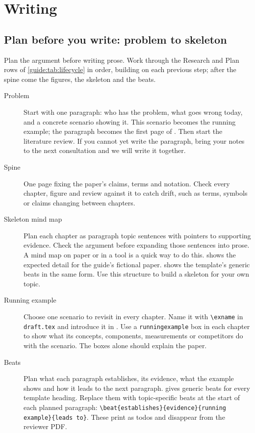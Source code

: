 \chapter{Writing}\label{guide:writing}
\section{Plan before you write: problem to skeleton}\label{guide:writing:spine}
Plan the argument before writing prose. Work through the Research and Plan rows of \cref{guide:tab:lifecycle} in order, building on each previous step; after the spine come the figures, the skeleton and the beats.
\begin{description}
  \item[Problem] Start with one paragraph: who has the problem, what goes wrong today, and a concrete scenario showing it. This scenario becomes the running example; the paragraph becomes the first page of . Then start the literature review. If you cannot yet write the paragraph, bring your notes to the next consultation and we will write it together.
  \item[Spine] One page fixing the paper's claims, terms and notation. Check every chapter, figure and review against it to catch drift, such as terms, symbols or claims changing between chapters.
  \item[Skeleton mind map] Plan each chapter as paragraph topic sentences with pointers to supporting evidence. Check the argument before expanding those sentences into prose. A mind map on paper or in a tool is a quick way to do this.  shows the expected detail for the guide's fictional paper.  shows the template's generic beats in the same form. Use this structure to build a skeleton for your own topic.
  \item[Running example] Choose one scenario to revisit in every chapter. Name it with \texttt{\textbackslash exname} in \texttt{draft.tex} and introduce it in . Use a \texttt{runningexample} box in each chapter to show what its concepts, components, measurements or competitors do with the scenario. The boxes alone should explain the paper.
  \item[Beats] Plan what each paragraph establishes, its evidence, what the example shows and how it leads to the next paragraph.  gives generic beats for every template heading. Replace them with topic-specific beats at the start of each planned paragraph: \texttt{\textbackslash beat\{establishes\}\{evidence\}\{running example\}\{leads to\}}. These print as todos and disappear from the reviewer PDF.
\end{description}

